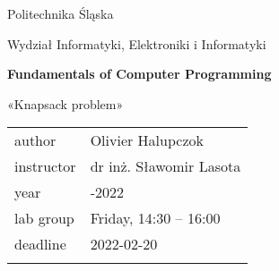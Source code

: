 \documentclass[12pt,a4paper,twoside]{article}
\begin{document}
\frenchspacing
\thispagestyle{empty}
\begin{center}
{\Large\sf Politechnika Śląska   %

Wydział Informatyki, Elektroniki i Informatyki

}

\vfill

 

\vfill\vfill

{\Huge\sffamily\bfseries Fundamentals of Computer Programming\par}

\vfill\vfill

{\LARGE\sf «Knapsack problem»} 


\vfill \vfill\vfill\vfill






\begin{tabular}{ll}
	\toprule
	author     & Olivier Halupczok                           \\
	instructor & dr inż. Sławomir Lasota \\
	year       & \2021-2022                     \\
	lab group  & Friday, 14:30 -- 16:00             \\
	deadline   & 2022-02-20                         \\
	\bottomrule
	           &
\end{tabular}

\end{center}

\cleardoublepage

\end{document}
